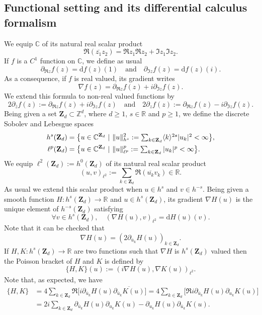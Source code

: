 \documentclass[11pt]{article}
\let\ts\textstyle
\theoremstyle{definition}
\begin{document}
\subsection{Functional setting and its differential calculus formalism}
We equip $\mathbb{C}$ of its natural real scalar product
\[
\Re (\overline{z_1} z_2) = \Re z_1 \Re z_2 + \Im z_1 \Im z_2.
\]
If $f$ is a $C^1$ function on $\mathbb{C}$, we define as usual
\[
\partial_{\Re z} f(z) = \mathrm{d}f(z)(1) \quad \text{and} \quad \partial_{\Im z} f(z) = \mathrm{d}f(z)(i).
\]
As a consequence, if $f$ is real valued, its gradient writes
\[
\nabla f(z) = \partial_{\Re z} f(z) + i \partial_{\Im z} f(z).
\]
We extend this formula to non-real valued functions by
\[
2 \partial_{\bar{z}} f(z):= \partial_{\Re z} f(z) + i \partial_{\Im z} f(z) \quad \text{and} \quad 2 \partial_{z} f(z):= \partial_{\Re z} f(z) - i \partial_{\Im z} f(z).
\]
Being given a set $\mathbf{Z}_d \subset \mathbb{Z}^d$, where $d\geq 1$, $s\in \mathbb{R}$ and $p\geq 1$, we define the discrete Sobolev and Lebesgue spaces
\begin{align}
\label{eq_def_hs}
h^s(\mathbf{Z}_d)&=\big\{ u\in \mathbb{C}^{\mathbf{Z}_d} \ | \ \|u\|_{h^s}^2:= \ts\sum_{ k \in \mathbf{Z}_d} \langle k \rangle^{2s} |u_k|^2 < \infty \big\},\\
\ell^p(\mathbf{Z}_d)&=\big\{ u\in \mathbb{C}^{\mathbf{Z}_d} \ | \ \|u\|_{\ell^p}^p:= \ts\sum_{ k \in \mathbf{Z}_d} |u_k|^p < \infty \big\}.\notag
\end{align}
We equip $\ell^2(\mathbf{Z}_d):= h^0(\mathbf{Z}_d)$ of its natural real scalar product
\[
(u,v)_{\ell^2}:= \sum_{k\in \mathbf{Z}_d} \Re (\overline{u_k} v_k) \in \mathbb{R}.
\]
As usual we extend this scalar product when $u\in h^s$ and $v\in h^{-s}$.
Being given a smooth function $H: h^s(\mathbf{Z}_d) \to \mathbb{R}$ and $u\in h^s(\mathbf{Z}_d)$, its gradient $\nabla H(u)$ is the unique element of $h^{-s}(\mathbf{Z}_d)$ satisfying
\[
\forall v\in h^{s}(\mathbf{Z}_d), \quad (\nabla H(u),v)_{\ell^2} = \mathrm{d}H(u)(v).
\]
Note that it can be checked that
\[
\nabla H(u) = (2\partial_{\overline{u}_k} H(u))_{k\in \mathbf{Z}_d}.
\]
If $H,K: h^s(\mathbf{Z}_d) \to \mathbb{R}$ are two functions such that $\nabla H$ is $h^{s}(\mathbf{Z}_d)$ valued then the Poisson bracket of $H$ and $K$ is defined by
\[
\{ H,K\}(u):= (i \nabla H(u),\nabla K(u))_{\ell^2}.
\]
Note that, as expected, we have
\begin{equation}\label{eq_poisson_coord}
\begin{split}
\{ H,K\} &= 4 \sum_{k\in \mathbf{Z}_d} \Re \big[i\partial_{\bar{u}_k}H(u) \overline{\partial_{\bar{u}_k} K(u)} \big]= 4 \sum_{k\in \mathbf{Z}_d} \big[\Re i\partial_{\bar{u}_k}H(u) \partial_{u_k} K(u)\big] \\
&=2i \sum_{k\in \mathbf{Z}_d} \partial_{\bar{u}_k}H(u) \partial_{u_k} K(u) - \partial_{u_k}H(u) \partial_{\bar{u}_k} K(u).
\end{split}
\end{equation}
\end{document}
